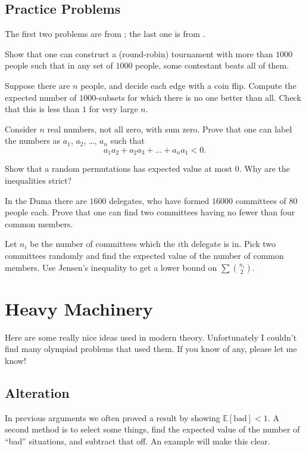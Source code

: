 \documentclass[11pt]{scrartcl}
\newcommand\EE{\mathbb E}
\begin{document}
\subsection{Practice Problems}
The first two problems are from \cite{ravi}; the last one is from \cite{poshen}.
\begin{problem}
	Show that one can construct a (round-robin) tournament with more than $1000$ people
	such that in any set of $1000$ people, some contestant beats all of them.
	\begin{sketch}
		Suppose there are $n$ people, and decide each edge with a coin flip.
		Compute the expected number of $1000$-subsets for which there is no one better than all.
		Check that this is less than $1$ for very large $n$.
	\end{sketch}
\end{problem}
\begin{problem}
	[BAMO 2004] Consider $n$ real numbers, not all zero, with sum zero.
	Prove that one can label the numbers as $a_1$, $a_2$, \dots, $a_n$ such that
	\[ a_1 a_2 + a_2 a_3 + \dots + a_n a_1 < 0. \]
	\begin{sketch}
		Show that a random permutations has expected value at most $0$.
		Why are the inequalities strict?
	\end{sketch}
\end{problem}
\begin{problem}
	[Russia 1996] In the Duma there are $1600$ delegates, who have formed $16000$ committees of $80$ people each. Prove that one can find two committees having no fewer than four common members.
	\begin{sketch}
		Let $n_i$ be the number of committees which the $i$th delegate is in.
		Pick two committees randomly and find the expected value of the number of common members.
		Use Jensen's inequality to get a lower bound on $\sum \binom{n_i}{2}$.
	\end{sketch}
\end{problem}




\section{Heavy Machinery}
Here are some really nice ideas used in modern theory.
Unfortunately I couldn't find many olympiad problems that used them.
If you know of any, please let me know!

\subsection{Alteration}
In previous arguments we often proved a result by showing $\EE[\text{bad}] < 1$.
A second method is to select some things, 
find the expected value of the number of ``bad'' situations,
and subtract that off.
An example will make this clear.
\end{document}
